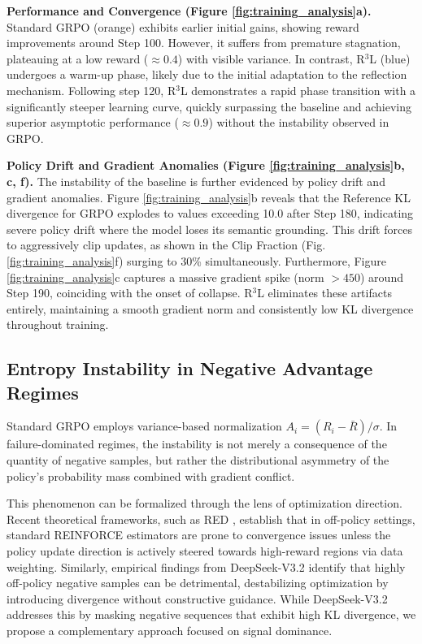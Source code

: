 \documentclass[11pt]{article}
\begin{document}
\textbf{Performance and Convergence (Figure \ref{fig:training_analysis}a).}
Standard GRPO (orange) exhibits earlier initial gains, showing reward improvements around Step 100. However, it suffers from premature stagnation, plateauing at a low reward ($\approx 0.4$) with visible variance. In contrast, R$^3$L (blue) undergoes a warm-up phase, likely due to the initial adaptation to the reflection mechanism. Following step 120, R$^3$L demonstrates a rapid phase transition with a significantly steeper learning curve, quickly surpassing the baseline and achieving superior asymptotic performance ($\approx 0.9$) without the instability observed in GRPO.

\textbf{Policy Drift and Gradient Anomalies (Figure \ref{fig:training_analysis}b, c, f).}
The instability of the baseline is further evidenced by policy drift and gradient anomalies. Figure \ref{fig:training_analysis}b reveals that the Reference KL divergence for GRPO explodes to values exceeding 10.0 after Step 180, indicating severe policy drift where the model loses its semantic grounding. This drift forces to aggressively clip updates, as shown in the Clip Fraction (Fig. \ref{fig:training_analysis}f) surging to 30\% simultaneously. Furthermore, Figure \ref{fig:training_analysis}c captures a massive gradient spike (norm $>450$) around Step 190, coinciding with the onset of collapse. R$^3$L eliminates these artifacts entirely, maintaining a smooth gradient norm and consistently low KL divergence throughout training.

\subsection{Entropy Instability in Negative Advantage Regimes}
\label{sec:analysis_positive}
Standard GRPO employs variance-based normalization $A_i = (R_i - \bar{R})/\sigma$. In failure-dominated regimes, the instability is not merely a consequence of the quantity of negative samples, but rather the distributional asymmetry of the policy's probability mass combined with gradient conflict.

This phenomenon can be formalized through the lens of optimization direction. Recent theoretical frameworks, such as RED \cite{yao2025group}, establish that in off-policy settings, standard REINFORCE estimators are prone to convergence issues unless the policy update direction is actively steered towards high-reward regions via data weighting. Similarly, empirical findings from DeepSeek-V3.2 \cite{liu2025deepseek32} identify that highly off-policy negative samples can be detrimental, destabilizing optimization by introducing divergence without constructive guidance. While DeepSeek-V3.2 addresses this by masking negative sequences that exhibit high KL divergence, we propose a complementary approach focused on signal dominance.
\end{document}
